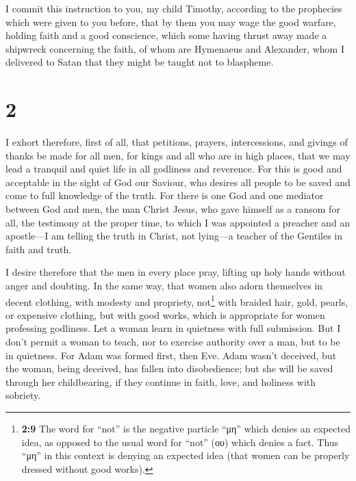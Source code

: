  I commit this instruction to you, my child Timothy,
according to the prophecies which were given to you before, that by them
you may wage the good warfare,  holding faith and a good
conscience, which some having thrust away made a shipwreck concerning
the faith,  of whom are Hymenaeus and Alexander, whom I
delivered to Satan that they might be taught not to blaspheme.

\hypertarget{section-1}{%
\section{2}\label{section-1}}

 I exhort therefore, first of all, that petitions,
prayers, intercessions, and givings of thanks be made for all men,
 for kings and all who are in high places, that we may
lead a tranquil and quiet life in all godliness and reverence.
 For this is good and acceptable in the sight of God our
Saviour,  who desires all people to be saved and come to
full knowledge of the truth.  For there is one God and one
mediator between God and men, the man Christ Jesus,  who
gave himself as a ransom for all, the testimony at the proper time,
 to which I was appointed a preacher and an apostle---I am
telling the truth in Christ, not lying---a teacher of the Gentiles in
faith and truth.

 I desire therefore that the men in every place pray,
lifting up holy hands without anger and doubting.  In the
same way, that women also adorn themselves in decent clothing, with
modesty and propriety, not\footnote{\textbf{2:9} The word for ``not'' is
  the negative particle ``μη'' which denies an expected idea, as opposed
  to the usual word for ``not'' (ου) which denies a fact. Thus ``μη'' in
  this context is denying an expected idea (that women can be properly
  dressed without good works).} with braided hair, gold, pearls, or
expensive clothing,  but with good works, which is
appropriate for women professing godliness.  Let a woman
learn in quietness with full submission.  But I don't
permit a woman to teach, nor to exercise authority over a man, but to be
in quietness.  For Adam was formed first, then Eve.
 Adam wasn't deceived, but the woman, being deceived, has
fallen into disobedience;  but she will be saved through
her childbearing, if they continue in faith, love, and holiness with
sobriety.

